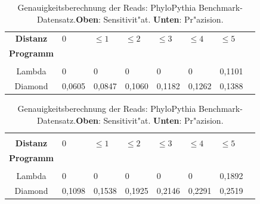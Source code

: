 \documentclass[10pt, a4paper]{report}[08.12.2015]
\begin{document}
      \begin{table}[H]
        \begin{tabular}{clllllll}
          \textbf{Distanz}&0&$\leq1$&$\leq2$&$\leq3$&$\leq4$&$\leq5$\\
          \textbf{Programm}&&&&&\\ \hline
          &&&&&&\\ 
          Lambda&0&0&0&0&0&0,1101\\
          Diamond&0,0605&0,0847&0,1060&0,1182&0,1262&0,1388\\
        \end{tabular}

         \begin{tabular}{clllllll}
         &&&&&&\\
          \textbf{Distanz}&0&$\leq1$&$\leq2$&$\leq3$&$\leq4$&$\leq5$\\
          \textbf{Programm}&&&&&\\ \hline 
          &&&&&&\\
          Lambda&0&0&0&0&0&0,1892\\
          Diamond&0,1098&0,1538&0,1925&0,2146&0,2291&0,2519\\
        \end{tabular}
        \caption[Genauigkeitsberechnung der Reads: PhyloPythia Benchmark-Datensatz.]{\small{Genauigkeitsberechnung der Reads: PhyloPythia Benchmark-Datensatz.\newline \textbf{Oben}: Sensitivit"at. \textbf{Unten}: Pr"azision.} }
        \label{tab:phylopythia}
      \end{table}
     
\end{document}

